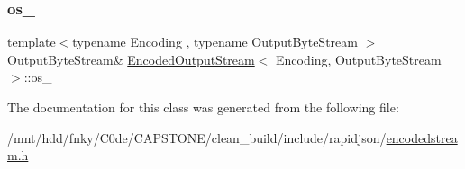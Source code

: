 \subsubsection{\texorpdfstring{os\+\_\+}{os\_}}
{\footnotesize\ttfamily template$<$typename Encoding , typename Output\+Byte\+Stream $>$ \\
Output\+Byte\+Stream\& \hyperlink{classEncodedOutputStream}{Encoded\+Output\+Stream}$<$ Encoding, Output\+Byte\+Stream $>$\+::os\+\_\+\hspace{0.3cm}{\ttfamily [private]}}



The documentation for this class was generated from the following file\+:\begin{DoxyCompactItemize}
\item 
/mnt/hdd/fnky/\+C0de/\+C\+A\+P\+S\+T\+O\+N\+E/clean\+\_\+build/include/rapidjson/\hyperlink{encodedstream_8h}{encodedstream.\+h}\end{DoxyCompactItemize}
